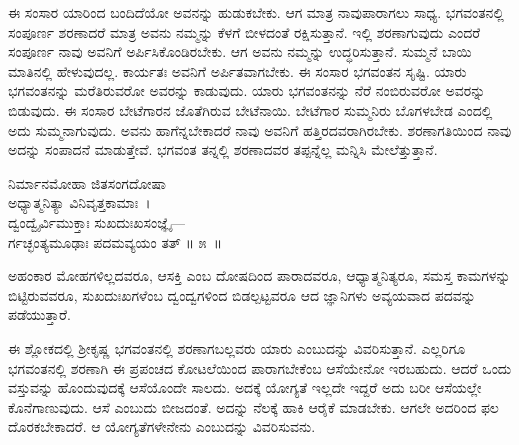 ಈ ಸಂಸಾರ ಯಾರಿಂದ ಬಂದಿದೆಯೋ ಅವನನ್ನು ಹುಡುಕಬೇಕು. ಆಗ ಮಾತ್ರ ನಾವು\break ಪಾರಾಗಲು ಸಾಧ್ಯ. ಭಗವಂತನಲ್ಲಿ ಸಂಪೂರ್ಣ ಶರಣಾದರೆ ಮಾತ್ರ ಅವನು ನಮ್ಮನ್ನು ಕೆಳಗೆ ಬೀಳದಂತೆ ರಕ್ಷಿಸುತ್ತಾನೆ. ಇಲ್ಲಿ ಶರಣಾಗುವುದು ಎಂದರೆ ಸಂಪೂರ್ಣ ನಾವು ಅವನಿಗೆ ಅರ್ಪಿಸಿ\-ಕೊಂಡಿರಬೇಕು. ಆಗ ಅವನು ನಮ್ಮನ್ನು ಉದ್ಧರಿಸುತ್ತಾನೆ. ಸುಮ್ಮನೆ ಬಾಯಿ ಮಾತಿನಲ್ಲಿ ಹೇಳುವುದಲ್ಲ. ಕಾರ್ಯತಃ ಅವನಿಗೆ ಅರ್ಪಿತವಾಗಬೇಕು. ಈ ಸಂಸಾರ ಭಗವಂತನ ಸೃಷ್ಟಿ. ಯಾರು ಭಗವಂತನನ್ನು ಮರೆತಿರುವರೋ ಅವರನ್ನು ಕಾಡುವುದು. ಯಾರು ಭಗವಂತನನ್ನು ನೆರೆ ನಂಬಿರುವರೋ ಅವರನ್ನು ಬಿಡುವುದು. ಈ ಸಂಸಾರ ಬೇಟೆಗಾರನ ಜೊತೆಗಿರುವ ಬೇಟೆನಾಯಿ. ಬೇಟೆಗಾರ ಸುಮ್ಮನಿರು ಬೊಗಳಬೇಡ ಎಂದಲ್ಲಿ ಅದು ಸುಮ್ಮನಾಗುವುದು. ಅವನು ಹಾಗೆನ್ನ\-ಬೇಕಾದರೆ ನಾವು ಅವನಿಗೆ ಹತ್ತಿರದವರಾಗಿರಬೇಕು. ಶರಣಾಗತಿಯಿಂದ ನಾವು ಅದನ್ನು ಸಂಪಾದನೆ ಮಾಡುತ್ತೇವೆ. ಭಗವಂತ ತನ್ನಲ್ಲಿ ಶರಣಾದವರ ತಪ್ಪನ್ನೆಲ್ಲ ಮನ್ನಿಸಿ ಮೇಲೆತ್ತುತ್ತಾನೆ.

\begin{shloka}
ನಿರ್ಮಾನಮೋಹಾ ಜಿತಸಂಗದೋಷಾ \\ ಅಧ್ಯಾತ್ಮನಿತ್ಯಾ ವಿನಿವೃತ್ತಕಾಮಾಃ~।\\ದ್ವಂದ್ವೈರ್ವಿಮುಕ್ತಾಃ ಸುಖದುಃಖಸಂಜ್ಞೈ—\\ ರ್ಗಚ್ಛಂತ್ಯಮೂಢಾಃ ಪದಮವ್ಯಯಂ ತತ್ \hfill॥ ೫~॥
\end{shloka}

\begin{artha}
ಅಹಂಕಾರ ಮೋಹಗಳಿಲ್ಲದವರೂ, ಆಸಕ್ತಿ ಎಂಬ ದೋಷದಿಂದ ಪಾರಾದವರೂ, ಆಧ್ಯಾತ್ಮನಿತ್ಯರೂ, ಸಮಸ್ತ ಕಾಮಗಳನ್ನು ಬಿಟ್ಟಿರುವವರೂ, ಸುಖದುಃಖಗಳೆಂಬ ದ್ವಂದ್ವಗಳಿಂದ ಬಿಡಲ್ಪಟ್ಟವರೂ ಆದ ಜ್ಞಾನಿಗಳು ಅವ್ಯಯವಾದ ಪದವನ್ನು ಪಡೆಯುತ್ತಾರೆ.
\end{artha}

ಈ ಶ್ಲೋಕದಲ್ಲಿ ಶ‍್ರೀಕೃಷ್ಣ ಭಗವಂತನಲ್ಲಿ ಶರಣಾಗಬಲ್ಲವರು ಯಾರು ಎಂಬುದನ್ನು ವಿವರಿಸುತ್ತಾನೆ. ಎಲ್ಲರಿಗೂ ಭಗವಂತನಲ್ಲಿ ಶರಣಾಗಿ ಈ ಪ್ರಪಂಚದ ಕೋಟಲೆಯಿಂದ ಪಾರಾಗ\-ಬೇಕೆಂಬ ಆಸೆಯೇನೋ ಇರಬಹುದು. ಆದರೆ ಒಂದು ವಸ್ತುವನ್ನು ಹೊಂದುವುದಕ್ಕೆ ಆಸೆಯೊಂದೇ ಸಾಲದು. ಅದಕ್ಕೆ ಯೋಗ್ಯತೆ ಇಲ್ಲದೇ ಇದ್ದರೆ ಅದು ಬರೀ ಆಸೆಯಲ್ಲೇ ಕೊನೆಗಾಣುವುದು. ಆಸೆ ಎಂಬುದು ಬೀಜದಂತೆ. ಅದನ್ನು ನೆಲಕ್ಕೆ ಹಾಕಿ ಆರೈಕೆ ಮಾಡಬೇಕು. ಆಗಲೇ ಅದರಿಂದ ಫಲ ದೊರಕಬೇಕಾದರೆ. ಆ ಯೋಗ್ಯತೆಗಳೇನೇನು ಎಂಬುದನ್ನು ವಿವರಿಸುವನು.

